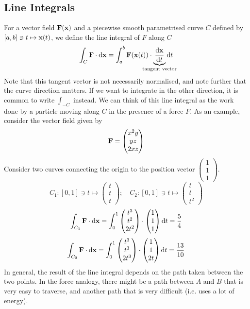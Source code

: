 \documentclass{article}
\begin{document}
\subsection{Line Integrals}
For a vector field $\vb F(\vb x)$ and a piecewise smooth parametrised curve $C$ defined by $[a, b] \ni t \mapsto \vb x(t)$, we define the line integral of $F$ along $C$
\[ \int_C \vb F \cdot \dd \vb x = \int_a^b \vb F(\vb x(t)) \cdot \underbrace{\frac{\dd \vb x}{\dd{t}}}_{\mathclap{\text{tangent vector}}} \dd{t} \]
Note that this tangent vector is not necessarily normalised, and note further that the curve direction matters. If we want to integrate in the other direction, it is common to write $\int_{-C}$ instead. We can think of this line integral as the work done by a particle moving along $C$ in the presence of a force $F$. As an example, consider the vector field given by
\[ \vb F = \begin{pmatrix}
		x^2 y \\ yz \\ 2xz
	\end{pmatrix} \]
Consider two curves connecting the origin to the position vector $\begin{pmatrix}
		1 \\ 1 \\ 1
	\end{pmatrix}$.
\[ C_1 \colon [0, 1] \ni t \mapsto \begin{pmatrix}
		t \\ t \\ t
	\end{pmatrix};\quad C_2 \colon [0, 1] \ni t \mapsto \begin{pmatrix}
		t \\ t \\ t^2
	\end{pmatrix} \]
\[ \int_{C_1}\vb F \cdot \dd \vb x = \int_0^1 \begin{pmatrix}
		t^3 \\ t^2 \\ 2t^2
	\end{pmatrix} \cdot \begin{pmatrix}
		1 \\ 1 \\ 1
	\end{pmatrix} \dd{t} = \frac{5}{4} \]
\[ \int_{C_2}\vb F \cdot \dd \vb x = \int_0^1 \begin{pmatrix}
		t^3 \\ t^3 \\ 2t^3
	\end{pmatrix} \cdot \begin{pmatrix}
		1 \\ 1 \\ 2t
	\end{pmatrix} \dd{t} = \frac{13}{10} \]
In general, the result of the line integral depends on the path taken between the two points. In the force analogy, there might be a path between $A$ and $B$ that is very easy to traverse, and another path that is very difficult (i.e. uses a lot of energy).
\end{document}
